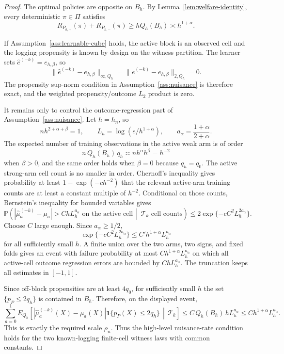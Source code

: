 \documentclass[11pt]{article}
\renewcommand{\Pr}{\mathbb{P}}
\newcommand{\one}{\mathbf{1}}
\theoremstyle{definition}
\theoremstyle{plain}
\theoremstyle{remark}
\begin{document}
\begin{proof}
The optimal policies are opposite on \(B_h\).  By
Lemma~\ref{lem:welfare-identity}, every deterministic \(\pi\in\Pi\) satisfies
\[
R_{P_{h,+}}(\pi)+R_{P_{h,-}}(\pi)
\ge h Q_h(B_h)
\asymp h^{1+\alpha}.
\]

If Assumption~\ref{ass:learnable-cube} holds, the active block is an observed
cell and the logging propensity is known by design on the witness partition.
The learner sets \(\widehat e^{(-k)}=e_{h,\beta}\), so
\[
\|\widehat e^{(-k)}-e_{h,\beta}\|_{\infty,Q_h}
=
\|\widehat e^{(-k)}-e_{h,\beta}\|_{2,Q_h}
=0.
\]
The propensity sup-norm condition in Assumption~\ref{ass:nuisance} is
therefore exact, and the weighted propensity/outcome \(L_2\) product is zero.

It remains only to control the outcome-regression part of
Assumption~\ref{ass:nuisance}.  Let \(h=h_n\), so
\[
n h^{2+\alpha+\beta}=1,
\qquad
L_h=\log(e/h^{1+\alpha}),
\qquad
a_\alpha=\frac{1+\alpha}{2+\alpha}.
\]
The expected number of training observations in the active weak arm is of
order
\[
n\,Q_h(B_h)\,q_h\asymp n h^\alpha h^\beta=h^{-2}
\]
when \(\beta>0\), and the same order holds when \(\beta=0\) because
\(q_h=q_0\).  The active strong-arm cell count is no smaller in order.
Chernoff's inequality gives probability at least \(1-\exp(-c h^{-2})\) that
the relevant active-arm training counts are at least a constant multiple of
\(h^{-2}\).  Conditional on those counts, Bernstein's inequality for bounded
variables gives
\[
\Pr\!\left(
|\widehat\mu_a^{(-k)}-\mu_a|>C h L_h^{a_\alpha}
\text{ on the active cell}
\,\middle|\,\mathcal T_k\text{ cell counts}\right)
\le 2\exp\{-c C^2 L_h^{2a_\alpha}\}.
\]
Choose \(C\) large enough.  Since \(a_\alpha\ge1/2\),
\[
\exp\{-c C^2 L_h^{2a_\alpha}\}
\le C' h^{1+\alpha}L_h^{a_\alpha}
\]
for all sufficiently small \(h\).  A finite union over the two arms, two
signs, and fixed folds gives an event with failure probability at most
\(C h^{1+\alpha}L_h^{a_\alpha}\) on which all active-cell outcome
regression errors are bounded by \(C h L_h^{a_\alpha}\).  The truncation
keeps all estimates in \([-1,1]\).

Since off-block propensities are at least \(4q_0\), for sufficiently small
\(h\) the set \(\{p_P\le2q_h\}\) is contained in \(B_h\).  Therefore, on the
displayed event,
\[
\sum_{a=0}^1
E_{Q_h}\!\left[
|\widehat\mu_a^{(-k)}(X)-\mu_a(X)|
\one\{p_P(X)\le2q_h\}
\,\middle|\,\mathcal T_k\right]
\le C\,Q_h(B_h)\,hL_h^{a_\alpha}
\le C h^{1+\alpha}L_h^{a_\alpha}.
\]
This is exactly the required scale \(\rho_n\).  Thus the high-level
nuisance-rate condition holds for the two known-logging finite-cell witness
laws with common constants.
\end{proof}
\end{document}
